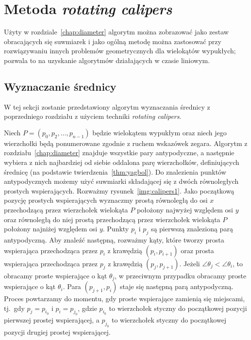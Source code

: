 \chapter{Metoda \emph{rotating calipers}\label{chap:calipers}}
Użyty w rozdziale~\ref{chap:diameter} algorytm można zobrazować jako
zestaw obracających się suwmiarek i jako ogólną metodę można
zastosować przy rozwiązywaniu innych problemów geometrycznych dla
wielokątów wypukłych; pozwala to na uzyskanie algorytmów działających
w czasie liniowym.

\section{Wyznaczanie średnicy}
W tej sekcji zostanie przedstawiony algorytm wyznaczania średnicy z
poprzedniego rozdziału z użyciem techniki \emph{rotating calipers}.

Niech $P = (p_0, p_2, \ldots, p_{n-1})$ będzie wielokątem wypukłym
oraz niech jego wierzchołki będą ponumerowane zgodnie z ruchem
wskazówek zegara. Algorytm z rozdziału~\ref{chap:diameter} znajduje
wszystkie pary antypodyczne, a następnie wybiera z nich najbardziej od
siebie oddalona parę wierzchołków, definiujących średnicę (na
podstawie twierdzenia~\ref{thm:yagbol}). Do znalezienia punktów
antypodycznych możemy użyć suwmiarki składającej się z dwóch
równoległych prostych wspierających. Rozważmy
rysunek~\ref{img:calipers1}. Jako początkową pozycję prostych
wspierających wyznaczmy prostą równoległą do osi $x$ przechodzącą
przez wierzchołek wielokąta $P$ położony najwyżej względem osi $y$
oraz równoległą do niej prostą przechodzącą przez wierzchołek
wielokąta $P$ położony najniżej względem osi $y$. Punkty $p_i$ i $p_j$
są pierwszą znalezioną parą antypodyczną. Aby znaleźć następną,
rozważmy kąty, które tworzy prosta wspierająca przechodząca przez
$p_i$ z krawędzią $(p_i, p_{i+1})$ oraz prosta wspierająca
przechodząca przez $p_j$ z krawędzią $(p_j, p_{j+1})$.  Jeżeli
$\angle{\theta_j} < \angle{\theta_i}$, to obracamy proste wspierające
o kąt $\theta_j$, w przeciwnym przypadku obracamy proste wspierające o
kąt $\theta_i$. Para $(p_{j+1}, p_i)$ staje się następną parą
antypodyczną. Proces powtarzamy do momentu, gdy proste wspierające
zamienią się miejscami, tj.\ gdy $p_j = p_{i_0}$ i $p_i = p_{j_0}$,
gdzie $p_{i_0}$ to wierzchołek styczny do początkowej pozycji
pierwszej prostej wspierającej, a $p_{j_0}$ to wierzchołek styczny do
początkowej pozycji drugiej prostej wspierającej.

